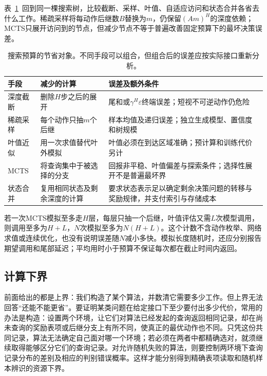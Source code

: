 表~\ref{tab:rl-planning-search-costs}~回到同一棵搜索树，比较截断、采样、叶值、自适应访问和状态合并各省去什么工作。稀疏采样将每动作后继数$B$替换为$m$，仍保留$(Am)^H$的深度依赖；MCTS只展开访问到的节点，但减少节点不等于普遍改善固定预算下的最坏决策误差。

\begin{table}[htbp]
 \centering
 \small
 \begin{tabularx}{\linewidth}{@{}l>{\raggedright\arraybackslash}X>{\raggedright\arraybackslash}X@{}}
  \toprule
  手段 & 减少的计算 & 误差及额外条件\\
  \midrule
  深度截断 & 删除$H$步之后的展开 & 尾和或$\gamma^H\varepsilon$终端误差；短视不可逆动作仍危险\\
  稀疏采样 & 每个动作只抽$m$个后继 & 样本均值及递归误差；独立生成模型、置信度和树规模\\
  叶值近似 & 用一次求值替代叶外模拟 & 叶值必须在到达区域准确；预计算和训练代价另计\\
  MCTS & 将查询集中于被选择的分支 & 回报非平稳、叶值偏差与探索条件；选择性展开不是普遍最坏界\\
  状态合并 & 复用相同状态及剩余深度的计算 & 要求状态表示足以确定剩余决策问题的转移与奖励规律，并支付索引与存储成本\\
  \bottomrule
 \end{tabularx}
 \caption{搜索预算的节省对象。不同手段可以组合，但组合后的误差应按实际接口重新分析。}
 \label{tab:rl-planning-search-costs}
\end{table}

若一次MCTS模拟至多走$H$层，每层只抽一个后继，叶值评估又需$L$次模型调用，则调用至多为$H+L$，$N$次模拟至多为$N(H+L)$。这个计数不含动作枚举、网络求值或连续优化，也没有说明误差随$N$减小多快。模拟长度随机时，还应分别报告期望调用和尾部延迟；平均用时小于预算不保证每次都在截止时间内返回。

\subsection{计算下界}
\label{sec:rl-planning-lower-bounds}

前面给出的都是上界：我们构造了某个算法，并数清它需要多少工作。但上界无法回答“还能不能更省”。要证明某类问题在给定接口下至少要付出多少代价，常用的办法是构造：设置两个环境，让它们对算法已经发起的查询返回相同记录，却在尚未查询的奖励表项或后继分支上有所不同，使真正的最优动作也不同。只凭这份共同记录，算法无法确定自己面对哪一个环境；若必须在两者中都精确选对，就须继续取得能够区分它们的查询记录。对允许随机失败的算法，则要控制两环境下查询记录分布的差别及相应的判别错误概率。这样才能分别得到精确表项读取和随机样本辨识的资源下界。

